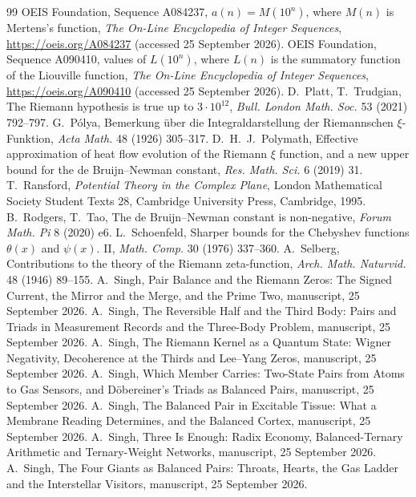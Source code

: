 \documentclass[11pt]{article}
\theoremstyle{definition}\newtheorem{definition}[theorem]{Definition}
\theoremstyle{remark}\newtheorem{remark}[theorem]{Remark}
\begin{document}
\begin{thebibliography}{99}
 OEIS Foundation, Sequence A084237, $a(n)=M(10^n)$, where $M(n)$ is Mertens's function, \emph{The On-Line Encyclopedia of Integer Sequences}, \url{https://oeis.org/A084237} (accessed 25 September 2026).
 OEIS Foundation, Sequence A090410, values of $L(10^n)$, where $L(n)$ is the summatory function of the Liouville function, \emph{The On-Line Encyclopedia of Integer Sequences}, \url{https://oeis.org/A090410} (accessed 25 September 2026).
 D.~Platt, T.~Trudgian, The Riemann hypothesis is true up to $3\cdot10^{12}$, \emph{Bull. London Math. Soc.} 53 (2021) 792--797.
 G.~P\'olya, Bemerkung \"uber die Integraldarstellung der Riemannschen $\xi$-Funktion, \emph{Acta Math.} 48 (1926) 305--317.
 D.~H.~J.~Polymath, Effective approximation of heat flow evolution of the Riemann $\xi$ function, and a new upper bound for the de Bruijn--Newman constant, \emph{Res. Math. Sci.} 6 (2019) 31.
 T.~Ransford, \emph{Potential Theory in the Complex Plane}, London Mathematical Society Student Texts 28, Cambridge University Press, Cambridge, 1995.
 B.~Rodgers, T.~Tao, The de Bruijn--Newman constant is non-negative, \emph{Forum Math. Pi} 8 (2020) e6.
 L.~Schoenfeld, Sharper bounds for the Chebyshev functions $\theta(x)$ and $\psi(x)$. II, \emph{Math. Comp.} 30 (1976) 337--360.
 A.~Selberg, Contributions to the theory of the Riemann zeta-function, \emph{Arch. Math. Naturvid.} 48 (1946) 89--155.
 A.~Singh, Pair Balance and the Riemann Zeros: The Signed Current, the Mirror and the Merge, and the Prime Two, manuscript, 25 September 2026.
 A.~Singh, The Reversible Half and the Third Body: Pairs and Triads in Measurement Records and the Three-Body Problem, manuscript, 25 September 2026.
 A.~Singh, The Riemann Kernel as a Quantum State: Wigner Negativity, Decoherence at the Thirds and Lee--Yang Zeros, manuscript, 25 September 2026.
 A.~Singh, Which Member Carries: Two-State Pairs from Atoms to Gas Sensors, and D\"obereiner's Triads as Balanced Pairs, manuscript, 25 September 2026.
 A.~Singh, The Balanced Pair in Excitable Tissue: What a Membrane Reading Determines, and the Balanced Cortex, manuscript, 25 September 2026.
 A.~Singh, Three Is Enough: Radix Economy, Balanced-Ternary Arithmetic and Ternary-Weight Networks, manuscript, 25 September 2026.
 A.~Singh, The Four Giants as Balanced Pairs: Throats, Hearts, the Gas Ladder and the Interstellar Visitors, manuscript, 25 September 2026.

\end{thebibliography}
\end{document}
